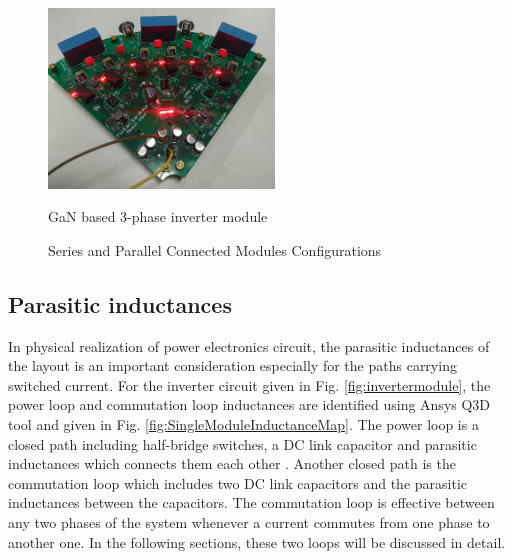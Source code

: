 \begin{figure}
\begin{minipage}[b]{.4\linewidth}
\centering
\includegraphics[width=6cm]{figures/invertermodule.jpg}
\caption{GaN based 3-phase inverter module}
\label{fig:invertermodule}
\end{minipage}%
\begin{minipage}[b]{.6\linewidth}
\centering
{}\quad
{}
\caption{Series and Parallel Connected Modules Configurations}
\label{fig:ModuleConnections}
\end{minipage}
\end{figure}

\subsection{Parasitic inductances}

In physical realization of power electronics circuit, the parasitic inductances of the layout is an important consideration especially for the paths carrying switched current.
For the inverter circuit given in Fig. \ref{fig:invertermodule}, the power loop and commutation loop inductances are identified using Ansys Q3D tool and given in Fig. \ref{fig:SingleModuleInductanceMap}. The power loop is a closed path including half-bridge switches, a DC link capacitor and parasitic inductances which connects them each other . Another closed path is the commutation loop which includes two DC link capacitors and the parasitic inductances between the capacitors. The commutation loop is effective between any two phases of the system whenever a current commutes from one phase to another one. In the following sections, these two loops will be discussed in detail.

